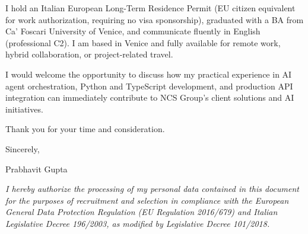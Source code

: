 \documentclass[11pt,a4paper]{article}
\begin{document}
I hold an Italian European Long-Term Residence Permit (EU citizen equivalent for work authorization, requiring no visa sponsorship), graduated with a BA from Ca' Foscari University of Venice, and communicate fluently in English (professional C2). I am based in Venice and fully available for remote work, hybrid collaboration, or project-related travel.

I would welcome the opportunity to discuss how my practical experience in AI agent orchestration, Python and TypeScript development, and production API integration can immediately contribute to NCS Group's client solutions and AI initiatives.

Thank you for your time and consideration.

Sincerely,

Prabhavit Gupta

\vspace{0.8em}
{\footnotesize \textit{I hereby authorize the processing of my personal data contained in this document for the purposes of recruitment and selection in compliance with the European General Data Protection Regulation (EU Regulation 2016/679) and Italian Legislative Decree 196/2003, as modified by Legislative Decree 101/2018.}\par}
\end{document}
